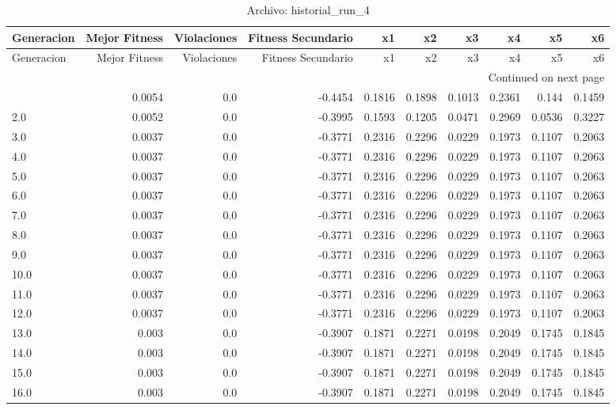\begin{longtable}{lrrrrrrrrr}
\caption{Archivo: historial\_run\_4}\label{tab:historial_run_4} \\
\toprule
Generacion & Mejor Fitness & Violaciones & Fitness Secundario & x1 & x2 & x3 & x4 & x5 & x6 \\
\midrule
\endfirsthead
\toprule
Generacion & Mejor Fitness & Violaciones & Fitness Secundario & x1 & x2 & x3 & x4 & x5 & x6 \\
\midrule
\endhead
\midrule
\multicolumn{10}{r}{Continued on next page} \\
\midrule
\endfoot
\bottomrule
\endlastfoot
1.0 & 0.0054 & 0.0 & -0.4454 & 0.1816 & 0.1898 & 0.1013 & 0.2361 & 0.144 & 0.1459 \\
2.0 & 0.0052 & 0.0 & -0.3995 & 0.1593 & 0.1205 & 0.0471 & 0.2969 & 0.0536 & 0.3227 \\
3.0 & 0.0037 & 0.0 & -0.3771 & 0.2316 & 0.2296 & 0.0229 & 0.1973 & 0.1107 & 0.2063 \\
4.0 & 0.0037 & 0.0 & -0.3771 & 0.2316 & 0.2296 & 0.0229 & 0.1973 & 0.1107 & 0.2063 \\
5.0 & 0.0037 & 0.0 & -0.3771 & 0.2316 & 0.2296 & 0.0229 & 0.1973 & 0.1107 & 0.2063 \\
6.0 & 0.0037 & 0.0 & -0.3771 & 0.2316 & 0.2296 & 0.0229 & 0.1973 & 0.1107 & 0.2063 \\
7.0 & 0.0037 & 0.0 & -0.3771 & 0.2316 & 0.2296 & 0.0229 & 0.1973 & 0.1107 & 0.2063 \\
8.0 & 0.0037 & 0.0 & -0.3771 & 0.2316 & 0.2296 & 0.0229 & 0.1973 & 0.1107 & 0.2063 \\
9.0 & 0.0037 & 0.0 & -0.3771 & 0.2316 & 0.2296 & 0.0229 & 0.1973 & 0.1107 & 0.2063 \\
10.0 & 0.0037 & 0.0 & -0.3771 & 0.2316 & 0.2296 & 0.0229 & 0.1973 & 0.1107 & 0.2063 \\
11.0 & 0.0037 & 0.0 & -0.3771 & 0.2316 & 0.2296 & 0.0229 & 0.1973 & 0.1107 & 0.2063 \\
12.0 & 0.0037 & 0.0 & -0.3771 & 0.2316 & 0.2296 & 0.0229 & 0.1973 & 0.1107 & 0.2063 \\
13.0 & 0.003 & 0.0 & -0.3907 & 0.1871 & 0.2271 & 0.0198 & 0.2049 & 0.1745 & 0.1845 \\
14.0 & 0.003 & 0.0 & -0.3907 & 0.1871 & 0.2271 & 0.0198 & 0.2049 & 0.1745 & 0.1845 \\
15.0 & 0.003 & 0.0 & -0.3907 & 0.1871 & 0.2271 & 0.0198 & 0.2049 & 0.1745 & 0.1845 \\
16.0 & 0.003 & 0.0 & -0.3907 & 0.1871 & 0.2271 & 0.0198 & 0.2049 & 0.1745 & 0.1845 \\

\end{longtable}
